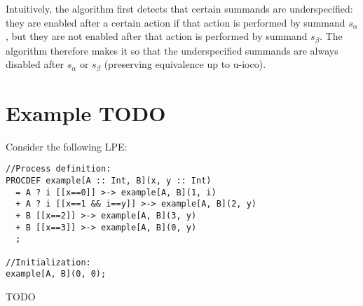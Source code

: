 Intuitively, the algorithm first detects that certain summands are underspecified: they are enabled after a certain action if that action is performed by summand $s_\alpha$, but they are not enabled after that action is performed by summand $s_\beta$.
The algorithm therefore makes it so that the underspecified summands are always disabled after $s_\alpha$ or $s_\beta$ (preserving equivalence up to u-ioco).

\section{Example TODO}

Consider the following LPE:

\begin{lstlisting}
//Process definition:
PROCDEF example[A :: Int, B](x, y :: Int)
  = A ? i [[x==0]] >-> example[A, B](1, i)
  + A ? i [[x==1 && i==y]] >-> example[A, B](2, y)
  + B [[x==2]] >-> example[A, B](3, y)
  + B [[x==3]] >-> example[A, B](0, y)
  ;

//Initialization:
example[A, B](0, 0);
\end{lstlisting}

TODO

